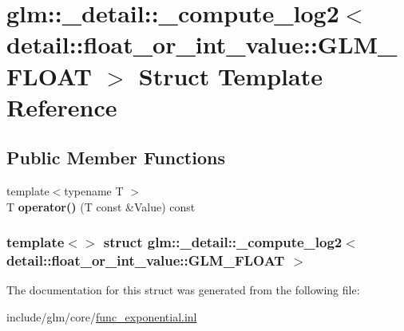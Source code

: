 \hypertarget{structglm_1_1__detail_1_1__compute__log2_3_01detail_1_1float__or__int__value_1_1GLM__FLOAT_01_4}{\section{glm\-:\-:\-\_\-detail\-:\-:\-\_\-compute\-\_\-log2$<$ detail\-:\-:float\-\_\-or\-\_\-int\-\_\-value\-:\-:\-G\-L\-M\-\_\-\-F\-L\-O\-A\-T $>$ \-Struct \-Template \-Reference}
\label{structglm_1_1__detail_1_1__compute__log2_3_01detail_1_1float__or__int__value_1_1GLM__FLOAT_01_4}
}
\subsection*{\-Public \-Member \-Functions}
\begin{DoxyCompactItemize}
\item 
\hypertarget{structglm_1_1__detail_1_1__compute__log2_3_01detail_1_1float__or__int__value_1_1GLM__FLOAT_01_4_a8814666ed10353997362f6fa0830ff88}{{\footnotesize template$<$typename T $>$ }\\\-T {\bfseries operator()} (\-T const \&\-Value) const }\label{structglm_1_1__detail_1_1__compute__log2_3_01detail_1_1float__or__int__value_1_1GLM__FLOAT_01_4_a8814666ed10353997362f6fa0830ff88}

\end{DoxyCompactItemize}
\subsubsection*{template$<$$>$ struct glm\-::\-\_\-detail\-::\-\_\-compute\-\_\-log2$<$ detail\-::float\-\_\-or\-\_\-int\-\_\-value\-::\-G\-L\-M\-\_\-\-F\-L\-O\-A\-T $>$}



\-The documentation for this struct was generated from the following file\-:\begin{DoxyCompactItemize}
\item 
include/glm/core/\hyperlink{func__exponential_8inl}{func\-\_\-exponential.\-inl}\end{DoxyCompactItemize}
